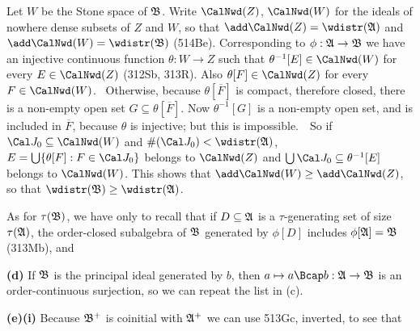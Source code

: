 {
Let $W$ be the Stone space of $\frak B$.   Write $\CalNwd(Z)$,
$\CalNwd(W)$ for
the ideals of nowhere dense subsets of $Z$ and $W$, so that
$\add\CalNwd(Z)=\wdistr(\frak A)$ and $\add\CalNwd(W)=\wdistr(\frak B)$
(514Be).   Corresponding to
$\phi:\frak A\to\frak B$ we have an injective continuous function
$\theta:W\to Z$ such that $\theta^{-1}[E]\in\CalNwd(W)$ for every
$E\in\CalNwd(Z)$ (312Sb, 313R).   Also $\theta[F]\in\CalNwd(Z)$ for every
$F\in\CalNwd(W)$.   \Prf\Quer\ Otherwise, because $\theta[\overline{F}]$ is
compact, therefore closed, there is a non-empty open set
$G\subseteq\theta[\overline{F}]$.   Now $\theta^{-1}[G]$ is a non-empty
open set, and is included in $\overline{F}$, because $\theta$ is
injective;  but this is impossible.\ \Bang\QeD\  So if
$\Cal J_0\subseteq\CalNwd(W)$ and $\#(\Cal J_0)<\wdistr(\frak A)$,
$E=\bigcup\{\theta[F]:F\in\Cal J_0\}$ belongs to $\CalNwd(Z)$ and
$\bigcup\Cal J_0\subseteq\theta^{-1}[E]$ belongs to $\CalNwd(W)$.   This
shows that $\add\CalNwd(W)\ge\add\CalNwd(Z)$, so that
$\wdistr(\frak B)\ge\wdistr(\frak A)$.

\medskip

 As for $\tau(\frak B)$, we have only to recall that if
$D\subseteq\frak A$ is a $\tau$-generating set of size $\tau(\frak A)$,
the order-closed subalgebra of $\frak B$ generated by $\phi[D]$ includes
$\phi[\frak A]=\frak B$ (313Mb), and


\medskip

{\bf (d)} If $\frak B$ is the principal ideal generated by $b$, then
$a\mapsto a\Bcap b:\frak A\to\frak B$ is an order-continuous surjection,
so we can repeat the list in (c).

\medskip

{\bf (e)(i)} Because $\frak B^+$ is coinitial with
$\frak A^+$ we can use 513Gc, inverted, to see that




\medskip

}
